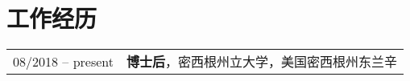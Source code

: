 \section*{工作经历}
\begin{tabular}{p{} p{}}
08/2018 -- present & \textbf{博士后}，密西根州立大学，美国密西根州东兰辛 \\
\end{tabular}
